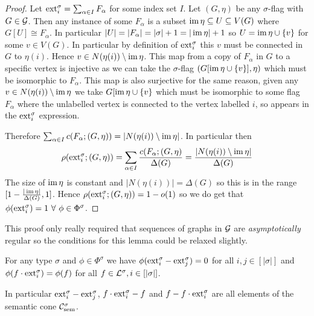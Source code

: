 \begin{proof}
    Let $\mathrm{ext}_i^\sigma=\sum_{\alpha\in I}F_\alpha$ for some index set $I$. Let
    $(G,\eta)$ be any $\sigma$-flag with $G\in\mathcal{G}$. Then any instance of some
    $F_\alpha$ is a subset $\operatorname{im}\eta \subseteq U \subseteq V(G)$ where
    $G[U] \cong F_\alpha$. In particular $|U|=|F_\alpha|=|\sigma|+1=|\operatorname{im}\eta| + 1$ so
    $U = \operatorname{im}\eta \cup \{v\}$ for some $v\in V(G)$. In particular by definition of
    $\mathrm{ext}_i^\sigma$ this $v$ must be connected in $G$ to $\eta(i)$. Hence
    $v \in N(\eta(i))\setminus \operatorname{im}\eta$. This map from a copy of $F_\alpha$ in $G$ to
    a specific vertex is injective as we can
    take the $\sigma$-flag $(G[\operatorname{im}\eta\cup\{v\}], \eta)$ which must be isomorphic
    to $F_\alpha$. This map is also surjective for the same reason, given any
    $v\in N(\eta(i)) \setminus \operatorname{im}\eta$ we take $G[\operatorname{im}\eta \cup \{v\}$ which must
    be isomorphic to some flag $F_\alpha$ where the unlabelled vertex is connected to
    the vertex labelled $i$, so appears in the $\mathrm{ext}_i^\sigma$ expression.

    Therefore $\sum_{\alpha\in I}c(F_\alpha; (G,\eta)) = |N(\eta(i))\setminus\operatorname{im}\eta|$.
    In particular then
    \[
        \rho(\mathrm{ext}_i^\sigma; (G,\eta))
        = \sum_{\alpha \in I} \frac{c(F_\alpha; (G,\eta)}{\Delta(G)}
        = \frac{|N(\eta(i)) \setminus \operatorname{im}\eta|}{\Delta(G)}
    \]
    The size of $\operatorname{im}\eta$ is constant and $|N(\eta(i))|=\Delta(G)$ so this is
    in the range $[1-\frac{|\operatorname{im}\eta|}{\Delta(G)}, 1]$. Hence
    $\rho(\mathrm{ext}^\sigma_i; (G,\eta)) = 1 - o(1)$ so we do get that
    $\phi(\ext_i^\sigma)=1\ \forall\ \phi\in\Phi^\sigma$.
\end{proof}

\begin{note}
    This proof only really required that sequences of graphs in $\mathcal{G}$ are
    \textit{asymptotically} regular so the conditions for this lemma could be relaxed
    slightly.
\end{note}

\begin{corollary}
    For any type $\sigma$ and $\phi\in\Phi^\sigma$ we
    have $\phi(\mathrm{ext}_i^\sigma - \mathrm{ext}_j^\sigma) = 0$ for all $i,j \in [|\sigma|]$
    and $\phi(f \cdot \mathrm{ext}_i^\sigma) = \phi(f)$ for all
    $f \in \mathcal{L}^\sigma, i \in [|\sigma|]$.

    In particular $\mathrm{ext}_i^\sigma - \mathrm{ext}_j^\sigma$,
    $f\cdot \mathrm{ext}_i^\sigma - f$ and $f - f\cdot\mathrm{ext}_i^\sigma$ are all
    elements of the semantic cone $\mathcal{C}_\mathrm{sem}^\sigma$.
\end{corollary}

